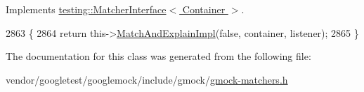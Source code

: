 Implements \hyperlink{classtesting_1_1MatcherInterface_a296b43607cd99d60365f0e6a762777cf}{testing\+::\+Matcher\+Interface$<$ Container $>$}.


\begin{DoxyCode}
2863                                                                     \{
2864     \textcolor{keywordflow}{return} this->\hyperlink{classtesting_1_1internal_1_1QuantifierMatcherImpl_a01384d42781094ddc5d9208b63f23b3d}{MatchAndExplainImpl}(\textcolor{keyword}{false}, container, listener);
2865   \}
\end{DoxyCode}


The documentation for this class was generated from the following file\+:\begin{DoxyCompactItemize}
\item 
vendor/googletest/googlemock/include/gmock/\hyperlink{gmock-matchers_8h}{gmock-\/matchers.\+h}\end{DoxyCompactItemize}
